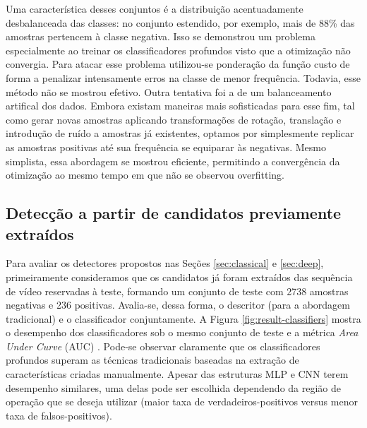     Uma característica desses conjuntos é a distribuição acentuadamente desbalanceada das classes: no conjunto estendido, por exemplo, mais de 88\% das amostras pertencem à classe negativa. Isso se demonstrou um problema especialmente ao treinar os classificadores profundos visto que a otimização não convergia. Para atacar esse problema utilizou-se ponderação da função custo de forma a penalizar intensamente erros na classe de menor frequência. Todavia, esse método não se mostrou efetivo. Outra tentativa foi a de um balanceamento artifical dos dados. Embora existam maneiras mais sofisticadas para esse fim, tal como gerar novas amostras aplicando transformações de rotação, translação e introdução de ruído a amostras já existentes, optamos por simplesmente replicar as amostras positivas até sua frequência se equiparar às negativas. Mesmo simplista, essa abordagem se mostrou eficiente, permitindo a convergência da otimização ao mesmo tempo em que não se observou overfitting.


    \begin{figure*}
    \centering
    \label{fig:result-classifiers-all}
    \hfil
    \label{fig:result-classifiers-all-zoom}
    \caption{Desempenho dos classificadores.}
    \label{fig:result-classifiers}
    \end{figure*}


\subsection{Detecção a partir de candidatos previamente extraídos}
    Para avaliar os detectores propostos nas Seções \ref{sec:classical} e \ref{sec:deep}, primeiramente consideramos que os candidatos já foram extraídos das sequência de vídeo reservadas à teste, formando um conjunto de teste com 2738 amostras negativas e 236 positivas. Avalia-se, dessa forma, o descritor (para a abordagem tradicional) e o classificador conjuntamente. A Figura \ref{fig:result-classifiers} mostra o desempenho dos classificadores sob o mesmo conjunto de teste e a métrica \textit{Area Under Curve} (AUC) \cite{evaluationMetrics}. Pode-se observar claramente que os classificadores profundos superam as técnicas tradicionais baseadas na extração de características criadas manualmente. Apesar das estruturas MLP e CNN terem desempenho similares, uma delas pode ser escolhida dependendo da região de operação que se deseja utilizar (maior taxa de verdadeiros-positivos versus menor taxa de falsos-positivos).


